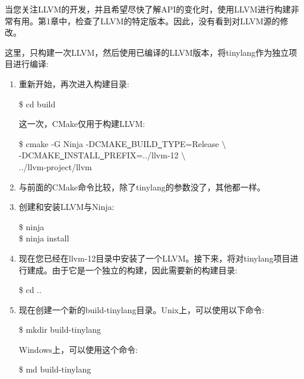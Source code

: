 当您关注LLVM的开发，并且希望尽快了解API的变化时，使用LLVM进行构建非常有用。第1章中，检查了LLVM的特定版本。因此，没有看到对LLVM源的修改。\par

这里，只构建一次LLVM，然后使用已编译的LLVM版本，将tinylang作为独立项目进行编译:\par

\begin{enumerate}
\item 重新开始，再次进入构建目录:
\begin{tcolorbox}[colback=white,colframe=black]
\$ cd build
\end{tcolorbox}

这一次，CMake仅用于构建LLVM:
\begin{tcolorbox}[colback=white,colframe=black]
\$ cmake -G Ninja -DCMAKE\underline{~}BUILD\underline{~}TYPE=Release $\setminus$ \\
\hspace*{1cm}-DCMAKE\underline{~}INSTALL\underline{~}PREFIX=../llvm-12 $\setminus$ \\
\hspace*{1cm}../llvm-project/llvm
\end{tcolorbox}

\item 与前面的CMake命令比较，除了tinylang的参数没了，其他都一样。
	
\item 创建和安装LLVM与Ninja:
\begin{tcolorbox}[colback=white,colframe=black]
\$ ninja \\
\$ ninja install
\end{tcolorbox}

\item 现在您已经在llvm-12目录中安装了一个LLVM。接下来，将对tinylang项目进行建成。由于它是一个独立的构建，因此需要新的构建目录:
\begin{tcolorbox}[colback=white,colframe=black]
\$ cd ..
\end{tcolorbox}
	
\item 现在创建一个新的build-tinylang目录。Unix上，可以使用以下命令:
\begin{tcolorbox}[colback=white,colframe=black]
	\$ mkdir build-tinylang
\end{tcolorbox}

Windows上，可以使用这个命令:
\begin{tcolorbox}[colback=white,colframe=black]
\$ md build-tinylang
\end{tcolorbox}


\end{enumerate}
